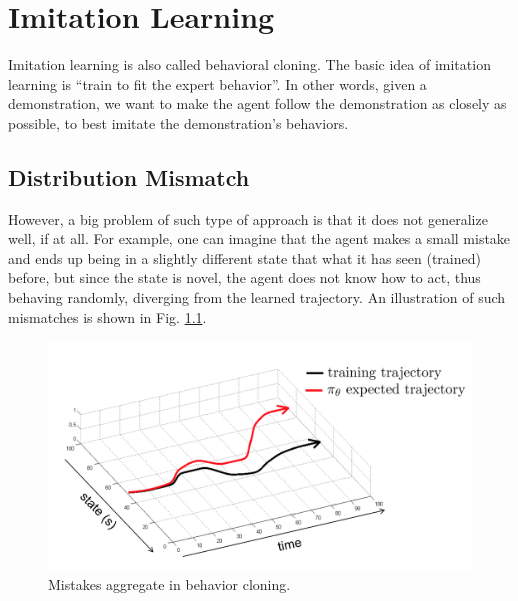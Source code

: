 \chapter{Imitation Learning}
Imitation learning is also called behavioral cloning. The basic idea of imitation learning is ``train to fit the expert behavior''. In other words, given a demonstration, we want to make the agent follow the demonstration as closely as possible, to best imitate the demonstration's behaviors.
\section{Distribution Mismatch}
However, a big problem of such type of approach is that it does not generalize well, if at all. For example, one can imagine that the agent makes a small mistake and ends up being in a slightly different state that what it has seen (trained) before, but since the state is novel, the agent does not know how to act, thus behaving randomly, diverging from the learned trajectory. An illustration of such mismatches is shown in Fig. \ref{fig:imitation_div}.
\begin{figure}
    \centering
    \includegraphics[scale = 0.3]{figures/imitation_div.png}
    \caption{Mistakes aggregate in behavior cloning.}
    \label{fig:imitation_div}
\end{figure}
